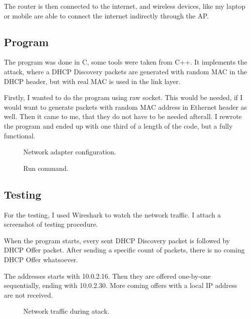 \documentclass[10pt,a4paper,titlepage]{article}
\begin{document}
    The router is then connected to the internet, and wireless devices, like my laptop
    or mobile are able to connect the internet indirectly through the AP.
    
    \subsection*{Program}
    
    The program was done in C, some tools were taken from C++. It implements the attack,
    where a DHCP Discovery packets are generated with random MAC in the DHCP header,
    but with real MAC is used in the link layer.
    
    Firstly, I wanted to do the program using raw socket. This would be needed, if 
    I would want to generate packets with random MAC address in Ethernet header as well.
    Then it came to me, that they do not have to be needed afterall. I rewrote the
    program and ended up with one third of a length of the code, but a fully functional.
    
    \begin{figure}[h!]
        \begin{center}
            \caption{ Network adapter configuration. \label{fig:ifconfig}}
        \end{center}
    \end{figure}
    
    \begin{figure}[h!]
        \begin{center}
            \caption{ Run command. \label{fig:run}}
        \end{center}
    \end{figure}
    
    
    \subsection*{Testing}
    For the testing, I used Wireshark to watch the network traffic. I attach a
    screenshot of testing procedure.
    
    When the program starts, every sent DHCP Discovery packet is followed by DHCP Offer
    packet. After sending a specific count of packets, there is no coming DHCP
    Offer whatsoever.
    
    The addresses starts with 10.0.2.16. Then they are offered one-by-one sequentially,
    ending with 10.0.2.30. More coming offers with a local IP address are not
    received.
    
    \begin{figure}[h!]
        \begin{center}
            \caption{ Network traffic during atack. \label{fig:wireshark}}
        \end{center}
    \end{figure}
    
    \newpage
    \printbibliography
    
    
\end{document}
